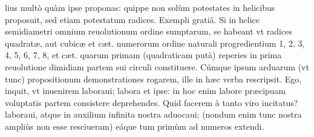 \documentclass[11pt,a4paper]{article}
\begin{document}

lius multò quàm ipse proponas: quippe non solùm potestates in helicibus proposuit, sed etiam potestatum radices. Exempli gratiâ. Si in helice semidiametri omnium reuolutionum ordine sumptarum, se habeant vt radices quadratæ, aut cubicæ et cæt. numerorum ordine naturali progredientium 1, 2, 3, 4, 5, 6, 7, 8, et cæt. quarum primam (quadraticam putà) reperies in prima reuolutione dimidiam partem sui circuli constituere. Cúmque ipsum arduarum (vt tunc) propositionum demonstrationes rogarem, ille in hæc verba rescripsit. Ego, inquit, vt inuenirem laboraui; labora et ipse: in hoc enim labore præcipuam voluptatis partem consistere deprehendes. Quid facerem à tanto viro incitatus? laboraui, atque in auxilium infinita nostra aduocaui; (nondum enim tunc nostra ampliùs non esse resciueram) eáque tum primùm ad numeros extendi.
\end{document}
